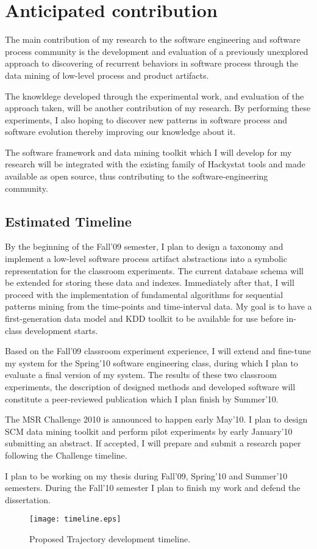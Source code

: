 \chapter{Anticipated contribution} \label{contribution}
The main contribution of my research to the software engineering and software process community is the development and evaluation of a previously unexplored approach to discovering of recurrent behaviors in software process through the data mining of low-level process and product artifacts.

The knowldege developed through the experimental work, and evaluation of the approach taken, will be another contribution of my research. By performing these experiments, I also hoping to discover new patterns in software process and software evolution thereby improving our knowledge about it.

The software framework and data mining toolkit which I will develop for my research will be integrated with the existing family of Hackystat tools and made available as open source, thus contributing to the software-engineering community.

\section{Estimated Timeline}
By the beginning of the Fall'09 semester, I plan to design a taxonomy and implement a low-level software process artifact abstractions into a symbolic representation for the classroom experiments. The current database schema will be extended for storing these data and indexes. Immediately after that, I will proceed with the implementation of fundamental algorithms for sequential patterns mining from the time-points and time-interval data. My goal is to have a first-generation data model and KDD toolkit to be available for use before in-class development starts. 

Based on the Fall'09 classroom experiment experience, I will extend and fine-tune my system for the Spring'10 software engineering class, during which I plan to evaluate a final version of my system. The results of these two classroom experiments, the description of designed methods and developed software will constitute a peer-reviewed publication which I plan finish by Summer'10.

The MSR Challenge 2010 is announced to happen early May'10. I plan to design SCM data mining toolkit and perform pilot experiments by early January'10 submitting an abstract. If accepted, I will prepare and submit a research paper following the Challenge timeline.

I plan to be working on my thesis during Fall'09, Spring'10 and Summer'10 semesters. During the Fall'10 semester I plan to finish my work and defend the dissertation.

\begin{figure}[tbp]
   \centering
   \texttt{[image: timeline.eps]}
   \caption{Proposed Trajectory development timeline.}
   \label{fig:timeline}
\end{figure}